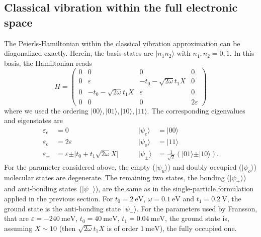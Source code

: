 \documentclass{article}
\begin{document}
\subsection{Classical vibration within the full electronic space}
The Peierls-Hamiltonian within the classical vibration approximation can be diagonalized exactly.
Herein, the basis states are $\vert n_1 n_2\rangle$ with $n_1,n_2=0,1$. In this basis, the Hamiltonian reads
\begin{equation}
	H = \begin{pmatrix}
		0 & 0 & 0 & 0\\
		0 & \varepsilon & -t_0-\sqrt{2\omega}t_1X & 0\\
		0 & -t_0-\sqrt{2\omega}t_1X & \varepsilon & 0\\
		0 & 0 & 0 & 2\varepsilon
	\end{pmatrix}
\end{equation}
where we used the ordering $\vert 00\rangle,\vert 01\rangle,\vert 10\rangle,\vert 11\rangle$. The corresponding eigenvalues and eigenstates are
\begin{align}
	\varepsilon_e &= 0\qquad & \vert \psi_e\rangle &= \vert 00\rangle\\
	\varepsilon_o &= 2\varepsilon\qquad & \vert \psi_o\rangle &= \vert 11\rangle\\
	\varepsilon_\pm &= \varepsilon\pm \vert t_0+t_1\sqrt{2\omega}X\vert \qquad &\vert \psi_\pm\rangle &= \frac{1}{\sqrt{2}}(\vert 01\rangle \pm \vert 10\rangle).
\end{align}
For the parameter considered above, the empty ($\vert\psi_u\rangle$) and doubly occupied ($\vert \psi_o\rangle$) molecular states are degenerate. The remaining two states, the bonding ($\vert \psi_+\rangle$) and anti-bonding states ($\vert \psi_-\rangle$), are the same as in the single-particle formulation applied in the previous section. For $t_0=\SI{2}{\electronvolt}$, $\omega=\SI{0.1}{\electronvolt}$ and $t_1=\SI{0.2}{\volt}$, the ground state is the anti-bonding state $\vert\psi_-\rangle$. For the parameters used by Fransson, that are $\varepsilon=\SI{-240}{\milli\electronvolt}$, $t_0=\SI{40}{\milli\electronvolt}$, $t_1=\SI{0.04}{\milli\electronvolt}$, the ground state is, assuming $X\sim 10$ (then $\sqrt{2\omega}t_1X$ is of order  $\SI{1}{\milli\electronvolt}$), the fully occupied one.
\end{document}
